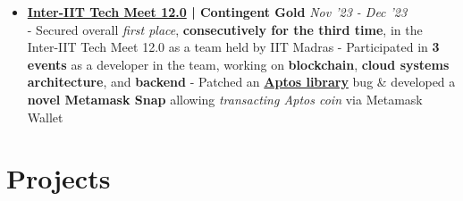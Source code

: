 \documentclass[a4paper,10pt]{extarticle} %
\begin{document}
\begin{itemize}[leftmargin=0.55cm, rightmargin=0.2cm, label={\Large\textbullet}]


 \item \textbf{\href{https://interiit-tech.org/}{Inter-IIT Tech Meet 12.0} | Contingent Gold} \hfill{\textit{Nov '23 - Dec '23}} \\
- Secured overall \textit{first place}, \textbf{consecutively for the third time}, in the Inter-IIT Tech Meet 12.0 as a team held by IIT Madras \newline
- Participated in \textbf{3 events} as a developer in the team, working on \textbf{blockchain}, \textbf{cloud systems architecture}, and \textbf{backend} \newline
- Patched an \href{https://github.com/aptos-labs/aptos-core}{\textbf{Aptos library}} bug \& developed a \textbf{novel Metamask Snap} allowing \textit{transacting Aptos coin} via Metamask Wallet

\end{itemize}


 \vspace{0.2cm}
\section{\textcolor{primary}{Projects}}
 \vspace{0.1cm}
\end{document}
